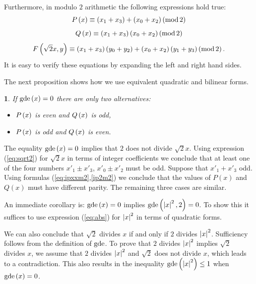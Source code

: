 \documentclass[english,journal]{extarticle}
\makeatletter
\theoremstyle{plain}
\theoremstyle{plain}
\theoremstyle{plain}
\theoremstyle{definition}
\theoremstyle{plain}
\newenvironment{proof}[1][\proofname]{\par
     \normalfont\topsep6\p@\@plus6\p@\relax
     \trivlist
     \itemindent\parindent
     \item[\hskip\labelsep
           \scshape
       #1]\ignorespaces
   }{%
     \endtrivlist\@endpefalse
   }
\providecommand{\proofname}{Proof}
\theoremstyle{plain}
\newtheorem{prop}{\protect\propositionname}
\providecommand{\propositionname}{\inputencoding{latin9}Proposition}
\makeatother
\begin{document}
Furthermore, in modulo $2$ arithmetic the following expressions hold true: 
\begin{equation}
\P{x} \equiv \left(x_{1}+x_{3}\right)+\left(x_{0}+x_{2}\right)\m\label{eq:ipxxm2}
\end{equation}
\begin{equation}
\Q{x} \equiv \left(x_{1}+x_{3}\right)\left(x_{0}+x_{2}
\right)\m\label{ip2m2}
\end{equation}
\begin{equation}
\F{\sqrt{2}x}y\equiv \left(x_{1}+x_{3}\right)\left(y_{0}+y_{2}\right)+\left(x_{0}+x_{
2}\right)\left(y_{1}+y_{3}\right)\m\label{eq:s2xy}.
\end{equation}
It is easy to verify these equations by expanding the left and right hand sides. 

The next proposition shows how we use equivalent quadratic and bilinear
forms.
\begin{prop}
\label{prop:alternatives}If $\gde\left(x\right)=0$ there are only
two alternatives:
\begin{itemize}
\item $\P x$ is even and $\Q x$ is odd,
\item $\P x$ is odd and $\Q x$ is even.
\end{itemize}
\end{prop}
\begin{proof}
The equality $\gde\left(x\right)=0$ implies that $2$ does not divide
$\sqrt{2}x$. Using expression (\ref{eq:sqrt2}) for $\sqrt{2}x$
in terms of integer coefficients we conclude that at least one of the
four numbers $x'_{1}\pm x'_{3}$, $x'_{0}\pm x'_{2}$ must be odd.
Suppose that $x'_{1}+x'_{3}$ odd. Using formulas
(\ref{eq:ipxxm2},\ref{ip2m2})
we conclude that the values of $P(x)$ and $Q(x)$ must have different parity.  The remaining three
cases are similar.
\end{proof}

An immediate corollary is: $\gde\left(x\right)=0$ implies $\gde\left(\abs
x^{2},2\right)=0$.
To show this it suffices to use expression (\ref{eq:abs}) for
$\abs x^{2}$ in terms of quadratic forms. 

We can also conclude that $\sqrt{2}$ divides $x$ if and only if
$2$ divides $\abs x^{2}$. Sufficiency follows from the definition of
$\gde$. To prove that $2$ divides $\abs x^{2}$ implies $\sqrt{2}$
divides $x$, we assume that $2$ divides $\abs x^{2}$ and $\sqrt{2}$
does not divide $x$, which leads to a contradiction. This also results in
the inequality $\gde\left(\abs x^{2}\right)\le 1$ when $\gde\left(x\right)=0$. 
\end{document}
